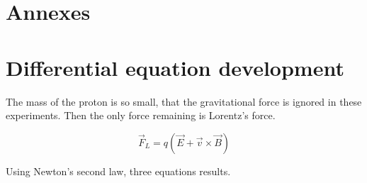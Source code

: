 \documentclass[a4paper,12pt,twoside]{article}
\begin{document}

\appendix
\section*{Annexes}

\section{Differential equation development} \label{ann:dev-eq-diff}
The mass of the proton is so small, that the gravitational force is ignored in these experiments.
Then the only force remaining is Lorentz's force.

\begin{equation*}
	\vec{F}_L = q(\vec{E} + \vec{v}\times\vec{B})
	\label{eq:lorentz-force}
\end{equation*}

Using Newton's second law, three equations results.
\end{document}
